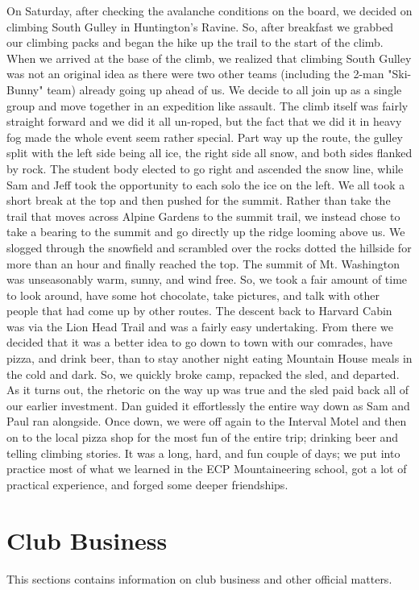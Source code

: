 \documentclass[10pt,a4paper]{article}
\newcommand\sect[1]{%
  \section*{#1}%
  \addcontentsline{toc}{section}{#1}}
\begin{document}
\begin{multicols}{2}
On Saturday, after checking the avalanche conditions on the board, we decided on climbing South Gulley in Huntington's Ravine.  So, after breakfast we grabbed our climbing packs and began the hike up the trail to the start of the climb.  When we arrived at the base of the climb, we realized that climbing South Gulley was not an original idea as there were two other teams (including the 2-man "Ski- Bunny" team) already going up ahead of us.  We decide to all join up as a single group and move together in an expedition like assault.   The climb itself was fairly straight forward and we did it all un-roped, but the fact that we did it in heavy fog made the whole event seem rather special.  Part way up the route, the gulley split with the left side being all ice, the right side all snow, and both sides flanked by rock.   The student body elected to go right and ascended the snow line, while Sam and Jeff took the opportunity to each solo the ice on the left.  We all took a short break at the top and then pushed for the summit.  Rather than take the trail that moves across Alpine Gardens to the summit trail, we instead chose to take a bearing to the summit and go directly up the ridge looming above us.   We slogged through the snowfield and scrambled over the rocks dotted the hillside for more than an hour and finally reached the top.  The summit of Mt. Washington was unseasonably warm, sunny, and wind free.  So, we took a fair amount of time to look around, have some hot chocolate, take pictures, and talk with other people that had come up by other routes.  
The descent back to Harvard Cabin was via the Lion Head Trail and was a fairly easy undertaking.  From there we decided that it was a better idea to go down to town with our comrades, have pizza, and drink beer, than to stay another night eating Mountain House meals in the cold and dark.  So, we quickly broke camp, repacked the sled, and departed.  As it turns out, the rhetoric on the way up was true and the sled paid back all of our earlier investment.  Dan guided it effortlessly the entire way down as Sam and Paul ran alongside.  Once down, we were off again to the Interval Motel and then on to the local pizza shop for the most fun of the entire trip; drinking beer and telling climbing stories.  It was a long, hard, and fun couple of days; we put into practice most of what we learned in the ECP Mountaineering school, got a lot of practical experience, and forged some deeper friendships.

\clearpage
\pagebreak

\sect{Club Business}
This sections contains information on club business and other official matters. 


\end{multicols}
\end{document}
